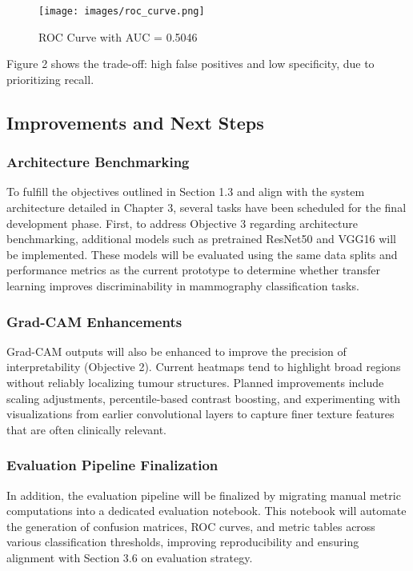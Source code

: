 \documentclass[12pt]{article}
\begin{document}
\begin{figure}[H]
\centering
\texttt{[image: images/roc\_curve.png]}
\caption{ROC Curve with AUC = 0.5046}
\end{figure}
Figure 2 shows the trade-off: high false positives and low specificity, due to prioritizing recall.

\subsection{Improvements and Next Steps}
\label{improvements}

\subsubsection{Architecture Benchmarking}
To fulfill the objectives outlined in Section 1.3 and align with the system architecture detailed in Chapter 3, several tasks have been scheduled for the final development phase. First, to address Objective 3 regarding architecture benchmarking, additional models such as pretrained ResNet50 and VGG16 will be implemented. These models will be evaluated using the same data splits and performance metrics as the current prototype to determine whether transfer learning improves discriminability in mammography classification tasks.

\subsubsection{Grad-CAM Enhancements}
Grad-CAM outputs will also be enhanced to improve the precision of interpretability (Objective 2). Current heatmaps tend to highlight broad regions without reliably localizing tumour structures. Planned improvements include scaling adjustments, percentile-based contrast boosting, and experimenting with visualizations from earlier convolutional layers to capture finer texture features that are often clinically relevant.

\subsubsection{Evaluation Pipeline Finalization}
In addition, the evaluation pipeline will be finalized by migrating manual metric computations into a dedicated evaluation notebook. This notebook will automate the generation of confusion matrices, ROC curves, and metric tables across various classification thresholds, improving reproducibility and ensuring alignment with Section 3.6 on evaluation strategy.
\end{document}
